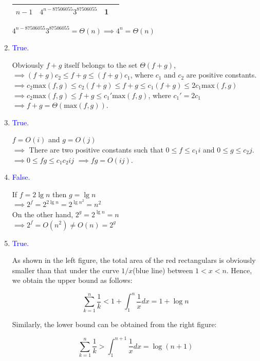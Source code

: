 \documentclass[12pt]{article}
\begin{document}
\begin{enumerate}
\begin{tabular}{@{}cccc@{}}
     $n-1$     & $4^{n-87506055}3^{87506055}$  & 1                \\ \bottomrule
    \end{tabular}\par
    $4^{n-87506055}3^{87506055}=\Theta(n) \implies 4^{n}=\Theta(n)$
 \item \textcolor{blue}{True.} \par
    Obviously $f+g$ itself belongs to the set $\Theta(f+g)$,\\
      $\implies (f+g)c_{2}\leq f+g \leq (f+g)c_{1}$, where $c_{1}$ and $c_{2}$ are positive constants.\\
      $\implies c_{2}\text{max}(f,g)\leq c_{2}(f+g)\leq f+g \leq c_{1}(f+g)\leq 2c_{1}\text{max}(f,g)$\\
      $\implies c_{2}\text{max}(f,g)\leq f+g \leq c_{1}'\text{max}(f,g)$, where $c_{1}'=2c_{1}$\\
      $\implies f+g=\Theta(\text{max}(f,g)).$
 \item \textcolor{blue}{True.} \par
    $f=O(i)$ and $g=O(j)$\\
    $\implies$ There are two positive constants such that $0 \leq f \leq c_{1}i$ and $0 \leq g \leq c_{2}j$.\\
    $\implies 0 \leq fg \leq c_{1}c_{2}ij$
    $\implies fg=O(ij)$.
 \item \textcolor{blue}{False.} \par
    If $f=2\lg n$ then $g=\lg n$\\
    $\implies 2^{f}=2^{2\lg n}=2^{\lg n^{2}}=n^2$\\
    On the other hand, $2^{g}=2^{\lg n}=n$\\
    $\implies 2^{f}=O(n^2)\neq O(n) = 2^{g}$
 \item \textcolor{blue}{True.} \par
    As shown in the left figure, the total area of the red rectangulars is obviously smaller than
    that under the curve $1/x$(blue line) between $1<x<n$. Hence, we obtain the upper bound as follows:

    \begin{equation}
       \sum_{k=1}^{n}\dfrac{1}{k}<1+\int_{1}^{n} \dfrac{1}{x}dx=1+\log n
       \label{upper}
    \end{equation}

    Similarly, the lower bound can be obtained from the right figure:

    \begin{equation}
       \sum_{k=1}^{n}\dfrac{1}{k}>\int_{1}^{n+1} \dfrac{1}{x}dx=\log (n+1)
       \label{lower}
    \end{equation}


\end{enumerate}
\end{document}
